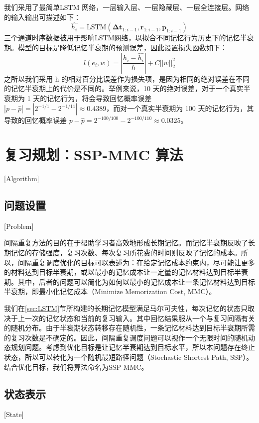 我们采用了最简单LSTM 网络，一层输入层、一层隐藏层、一层全连接层。网络的输入输出可描述如下：
\begin{equation}
\hat{h_i}=\mathrm{LSTM}(\boldsymbol{\Delta t}_{1:i-1}, \boldsymbol r_{1:i-1}, \boldsymbol p_{1:i-1})
\end{equation}
三个通道时序数据被用于影响LSTM网络，以拟合不同记忆行为历史下的记忆半衰期。模型的目标是降低记忆半衰期的预测误差，因此设置损失函数如下：
\begin{equation}
l(e_i,w)=|\frac{h_i-\hat{h_i}}{h}|+C||w||_{2}^{2}
\end{equation}
之所以我们采用 h 的相对百分比误差作为损失项，是因为相同的绝对误差在不同的记忆半衰期上的代价是不同的。举例来说，10 天的绝对误差，对于一个真实半衰期为 1 天的记忆行为，将会导致回忆概率误差 $|p-\hat{p}|=|2^{-1/1}-2^{-1/11}|\approx 0.4389$，而对一个真实半衰期为 100 天的记忆行为，其导致的回忆概率误差 $p-\hat{p}=2^{-100/100}-2^{-100/110}\approx 0.0325$。

\section{复习规划：SSP-MMC 算法}[Algorithm]

\subsection{问题设置}[Problem]

间隔重复方法的目的在于帮助学习者高效地形成长期记忆。而记忆半衰期反映了长期记忆的存储强度，复习次数、每次复习所花费的时间则反映了记忆的成本。所以，间隔重复调度优化的目标可以表述为：在给定记忆成本约束内，尽可能让更多的材料达到目标半衰期，或以最小的记忆成本让一定量的记忆材料达到目标半衰期。其中，后者的问题可以简化为如何以最小的记忆成本让一条记忆材料达到目标半衰期，即最小化记忆成本（Minimize Memorization Cost, MMC）。

我们在\ref{sec:LSTM}节所构建的长期记忆模型满足马尔可夫性，每次记忆的状态只取决于上一次的记忆状态和当前的复习输入。其中回忆结果服从一个与复习间隔有关的随机分布。由于半衰期状态转移存在随机性，一条记忆材料达到目标半衰期所需的复习次数是不确定的。因此，间隔重复调度问题可以视作一个无限时间的随机动态规划问题。考虑到优化目标是让记忆半衰期达到目标水平，所以本问题存在终止状态，所以可以转化为一个随机最短路径问题\cite[177-182]{bertsekasReinforcementLearningOptimal2019}（Stochastic Shortest Path, SSP）。结合优化目标，我们将算法命名为SSP-MMC。

\subsection{状态表示}[State]

